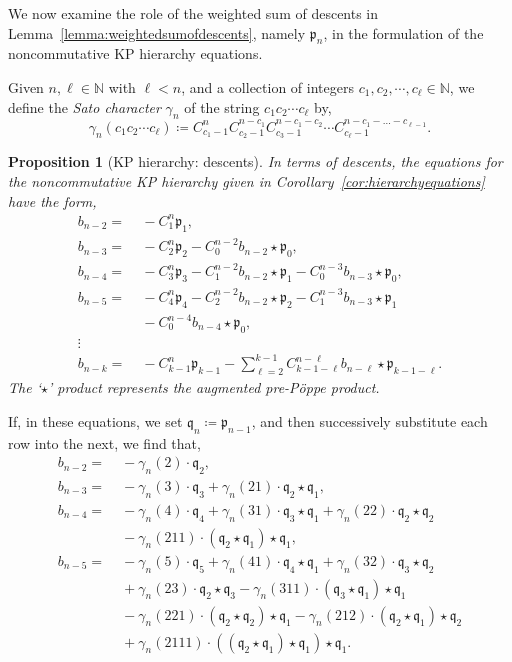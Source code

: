 \documentclass[5p,twocolumn]{elsarticle}
\newcommand*{\pf}{\mathfrak p}
\newcommand*{\qf}{\mathfrak q}
\newtheorem{prop}[theorem]{Proposition}
\begin{document}
We now examine the role of the weighted sum of descents in Lemma~\ref{lemma:weightedsumofdescents}, namely $\pf_n$, in the formulation of the noncommutative KP hierarchy equations.
%
\begin{definition}\label{def:Satochar}
Given $n,\ell\in\mathbb N$ with $\ell<n$, and a collection of integers $c_1,c_2,\cdots,c_\ell\in\mathbb N$, we define the \emph{Sato character} $\gamma_n$ of the string $c_1c_2\cdots c_\ell$ by, 
\begin{equation*}
     \gamma_n(c_1c_2\cdots c_\ell)\coloneqq C^n_{c_1-1}C^{n-c_1}_{c_2-1}C^{n-c_1-c_2}_{c_3-1}\cdots C^{n-c_1-\ldots-c_{\ell-1}}_{c_\ell-1}.
\end{equation*}
\end{definition}
%
\begin{prop}[KP hierarchy: descents]\label{pres:KP}
In terms of descents, the equations for the noncommutative KP hierarchy given in Corollary~\ref{cor:hierarchyequations} have the form,
\begin{align*}
  b_{n-2}=&\;-C_1^n\pf_1,\\
  b_{n-3}=&\;-C_2^n\pf_2-C_0^{n-2}b_{n-2}\star\pf_0,\\
  b_{n-4}=&\;-C_3^n\pf_3-C_1^{n-2}b_{n-2}\star\pf_1-C_0^{n-3}b_{n-3}\star\pf_0,\\
  b_{n-5}=&\;-C_4^n\pf_4-C_2^{n-2}b_{n-2}\star\pf_2-C_1^{n-3}b_{n-3}\star\pf_1\\
         &\;-C_0^{n-4}b_{n-4}\star\pf_0,\\
  \vdots & \\
  b_{n-k}=&\;-C^n_{k-1}\pf_{k-1}-\sum_{\ell=2}^{k-1}C^{n-\ell}_{k-1-\ell}b_{n-\ell}\star\pf_{k-1-\ell}.
\end{align*}
  The `$\star$' product represents the augmented pre-P\"oppe product. 
\end{prop}
%
If, in these equations, we set $\qf_n\coloneqq\pf_{n-1}$, and then successively substitute each row into the next, we find that,
\begin{align*}
  b_{n-2}=&\;-\gamma_n(2)\cdot\qf_2,\\
  b_{n-3}=&\;-\gamma_n(3)\cdot\qf_3+\gamma_n(21)\cdot\qf_2\star\qf_1,\\
  b_{n-4}=&\;-\gamma_n(4)\cdot\qf_4+\gamma_n(31)\cdot\qf_3\star\qf_1+\gamma_n(22)\cdot\qf_2\star\qf_2\\
         &\;-\gamma_n(211)\cdot(\qf_2\star\qf_1)\star\qf_1,\\
  b_{n-5}=&\;-\gamma_n(5)\cdot\qf_5+\gamma_n(41)\cdot\qf_4\star\qf_1+\gamma_n(32)\cdot\qf_3\star\qf_2\\
         &\;+\gamma_n(23)\cdot\qf_2\star\qf_3-\gamma_n(311)\cdot(\qf_3\star\qf_1)\star\qf_1\\
         &\;-\gamma_n(221)\cdot(\qf_2\star\qf_2)\star\qf_1-\gamma_n(212)\cdot(\qf_2\star\qf_1)\star\qf_2\\
         &\;+\gamma_n(2111)\cdot((\qf_2\star\qf_1)\star\qf_1)\star\qf_1.
\end{align*}
\end{document}
